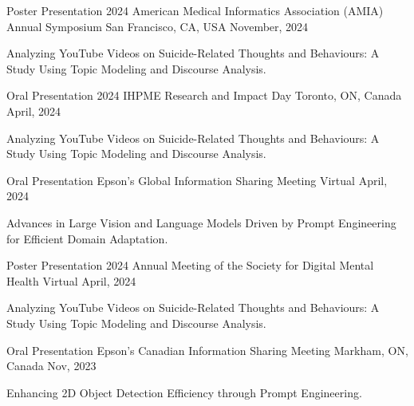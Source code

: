 
\vspace*{0.05cm}
\begin{cventries}
\cventry
{Poster Presentation} %
{2024 American Medical Informatics Association (AMIA) Annual Symposium} %
{San Francisco, CA, USA} %
{November, 2024} %
{ %
\begin{cvitems}
\item {Analyzing YouTube Videos on Suicide-Related Thoughts and Behaviours: A Study Using Topic Modeling and Discourse Analysis.}
\end{cvitems}
}
\cventry
{Oral Presentation} %
{2024 IHPME Research and Impact Day} %
{Toronto, ON, Canada} %
{April, 2024} %
{ %
\begin{cvitems}
\item {Analyzing YouTube Videos on Suicide-Related Thoughts and Behaviours: A Study Using Topic Modeling and Discourse Analysis.}
\end{cvitems}
}
\cventry
{Oral Presentation} %
{Epson's Global Information Sharing Meeting} %
{Virtual} %
{April, 2024} %
{ %
\begin{cvitems}
\item {Advances in Large Vision and Language Models Driven by Prompt Engineering for Efficient Domain Adaptation.}
\end{cvitems}
}
\cventry
{Poster Presentation} %
{2024 Annual Meeting of the Society for Digital Mental Health} %
{Virtual} %
{April, 2024} %
{ %
\begin{cvitems}
\item {Analyzing YouTube Videos on Suicide-Related Thoughts and Behaviours: A Study Using Topic Modeling and Discourse Analysis.}
\end{cvitems}
}
\cventry
{Oral Presentation} %
{Epson's Canadian Information Sharing Meeting} %
{Markham, ON, Canada} %
{Nov, 2023} %
{ %
\begin{cvitems}
\item {Enhancing 2D Object Detection Efficiency through Prompt Engineering.}

\end{cvitems}}
\end{cventries}
